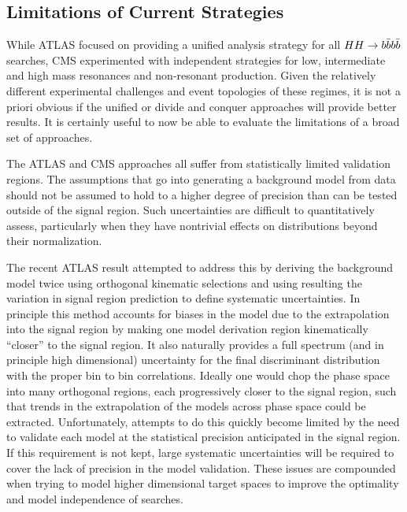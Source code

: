 \subsection{Limitations of Current Strategies}
\label{sec:limitations4b}

While ATLAS focused on providing a unified analysis strategy for all $HH\rightarrow b\bar{b}b\bar{b}$ searches,
CMS experimented with independent strategies for low, intermediate and high mass resonances and non-resonant production.
Given the relatively different experimental challenges and event topologies of these regimes, it is not a priori obvious if the unified or divide and conquer approaches will provide better results.
It is certainly useful to now be able to evaluate the limitations of a broad set of approaches. 

The ATLAS and CMS approaches all suffer from statistically limited validation regions.
The assumptions that go into generating a background model from data should not be assumed to hold to a higher degree of precision than can be tested outside of the signal region.
Such uncertainties are difficult to quantitatively assess, particularly when they have nontrivial effects on distributions beyond their normalization.

The recent ATLAS result \cite{Aaboud:2018knk,Bryant:2644551} attempted to address this by deriving the background model twice
using orthogonal kinematic selections and using resulting the variation in signal region prediction to define systematic uncertainties.
In principle this method accounts for biases in the model due to the extrapolation into the signal region by making one model derivation region kinematically ``closer'' to the signal region.
It also naturally provides a full spectrum (and in principle high dimensional) uncertainty for the final discriminant distribution with the proper bin to bin correlations.
Ideally one would chop the phase space into many orthogonal regions, each progressively closer to the signal region, such that trends in the extrapolation of the models across phase space could be extracted.
Unfortunately, attempts to do this quickly become limited by the need to validate each model at the statistical precision anticipated in the signal region.
If this requirement is not kept, large systematic uncertainties will be required to cover the lack of precision in the model validation. 
These issues are compounded when trying to model higher dimensional target spaces to improve the optimality and model independence of searches.

